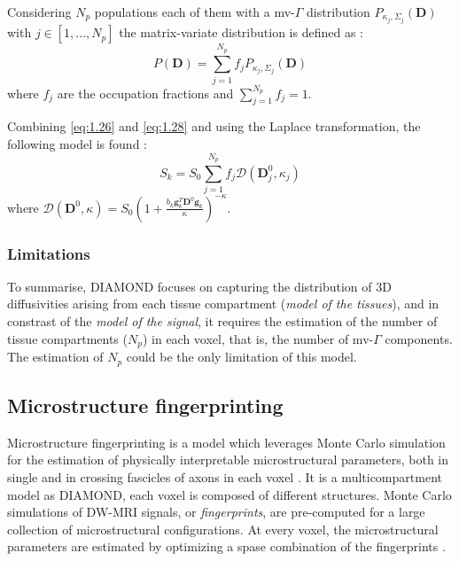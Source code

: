  Considering $N_p$ populations each of them with a mv-$\Gamma$ distribution $P_{\kappa_j,\Sigma_j}(\mathbf{D})$ with $j \in [1,...,N_p]$ the matrix-variate distribution is defined as \cite{scherrer2016diamond}:
 \begin{equation}\label{eq:1.28}
   P(\mathbf{D}) = \sum_{j=1}^{N_p} f_j P_{\kappa_j,\Sigma_j}(\mathbf{D})
 \end{equation} 
 where $f_j$ are the occupation fractions and $\sum_{j=1}^{N_p} f_j = 1$. 

 \begin{figure}[h]
   \centering
   \caption{}
   \label{fig:heterogeneous_compartments_diamond}
 \end{figure}

 Combining \ref{eq:1.26} and \ref{eq:1.28} and using the Laplace transformation, the following model is found \cite{scherrer2016diamond}:
 \begin{equation}
   S_k=S_0 \sum_{j=1}^{N_p} f_j \mathcal{D}(\mathbf{D}^0_j, \kappa_j)
 \end{equation}
 where $\mathcal{D}(\mathbf{D}^0,\kappa) = S_0 (1+\frac{b_k\mathbf{g}_k^T\mathbf{D}^0\mathbf{g}_k}{\kappa})^{-\kappa}$.

  \subsubsection*{Limitations}
  To summarise, DIAMOND focuses on capturing the distribution of 3D diffusivities arising from each tissue compartment (\emph{model of the tissues}), and in constrast of the \emph{model of the signal}, it requires the estimation of the number of tissue compartments ($N_p$) in each voxel, that is, the number of mv-$\Gamma$ components. The estimation of $N_p$ could be the only limitation of this model.
 \subsection{Microstructure fingerprinting}
 Microstructure fingerprinting is a model which leverages Monte Carlo simulation for the estimation of physically interpretable microstructural parameters, both in single and in crossing fascicles of axons in each voxel \cite{rensonnet2019towards}. It is a multicompartment model as DIAMOND, each voxel is composed of different structures. Monte Carlo simulations of DW-MRI signals, or \emph{fingerprints}, are pre-computed for a large collection of microstructural configurations. At every voxel, the microstructural parameters are estimated by optimizing a spase combination of the fingerprints \cite{rensonnet2019towards}.


